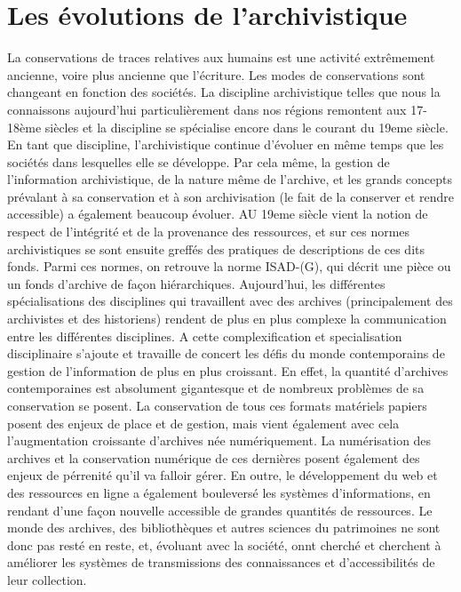 \documentclass[12pt]{report}
\begin{document}
\section{Les évolutions de l'archivistique}
La conservations de traces relatives aux humains est une activité extrêmement ancienne, voire plus ancienne que l'écriture. Les modes de conservations sont changeant en fonction des sociétés. La discipline archivistique telles que nous la connaissons aujourd'hui particulièrement dans nos régions remontent aux 17-18ème siècles et la discipline se spécialise encore dans le courant du 19eme siècle. En tant que discipline, l'archivistique continue d'évoluer en même temps que les sociétés dans lesquelles elle se développe. Par cela même, la gestion de l'information archivistique, de la nature même de l'archive, et les grands concepts prévalant à sa conservation et à son archivisation (le fait de la conserver et rendre accessible) a également beaucoup évoluer. AU 19eme siècle vient la notion de respect de l'intégrité et de la provenance des ressources, et sur ces normes archivistiques se sont ensuite greffés des pratiques de descriptions de ces dits fonds. Parmi ces normes, on retrouve la norme ISAD-(G), qui décrit une pièce ou un fonds d'archive de façon hiérarchiques. Aujourd'hui, les différentes spécialisations des disciplines qui travaillent avec des archives (principalement des archivistes et des historiens) rendent de plus en plus complexe la communication entre les différentes disciplines. A cette complexification et specialisation disciplinaire s'ajoute et travaille de concert les défis du monde contemporains de gestion de l'information de plus en plus croissant. En effet, la quantité d'archives contemporaines est absolument gigantesque et de nombreux problèmes de sa conservation se posent. La conservation de tous ces formats matériels papiers posent des enjeux de place et de gestion, mais vient également avec cela l'augmentation croissante d'archives née numériquement. La numérisation des archives et la conservation numérique de ces dernières posent également des enjeux de pérrenité qu'il va falloir gérer. 
En outre, le développement du web et des ressources en ligne a également bouleversé les systèmes d'informations, en rendant d'une façon nouvelle accessible de grandes quantités de ressources. Le monde des archives, des bibliothèques et autres sciences du patrimoines ne sont donc pas resté en reste, et, évoluant avec la société, onnt cherché et cherchent à améliorer les systèmes de transmissions des connaissances et d'accessibilités de leur collection.
\end{document}
